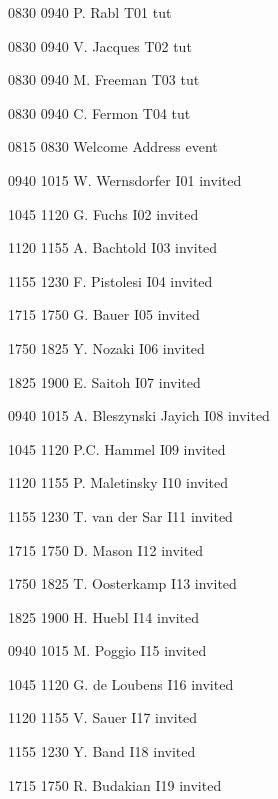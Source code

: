 
         {0830} {0940} {P. Rabl    } {} {T01} {tut}
        
         {0830} {0940} {V. Jacques} {} {T02} {tut}
        
         {0830} {0940} {M. Freeman} {} {T03} {tut}
        
         {0830} {0940} {C. Fermon} {} {T04} {tut}
        
         {0815} {0830} {\ft Welcome Address} {} {} {event}
        
         {0940} {1015} {W. Wernsdorfer} {} {I01} {invited}
        
         {1045} {1120} {G. Fuchs} {} {I02} {invited}
        
         {1120} {1155} {A. Bachtold} {} {I03} {invited}
        
         {1155} {1230} {F. Pistolesi} {} {I04} {invited}
        
         {1715} {1750} {G. Bauer} {} {I05} {invited}
        
         {1750} {1825} {Y. Nozaki} {} {I06} {invited}
        
         {1825} {1900} {E. Saitoh} {} {I07} {invited}
        
         {0940} {1015} {A. Bleszynski Jayich} {} {I08} {invited}
        
         {1045} {1120} {P.C. Hammel} {} {I09} {invited}
        
         {1120} {1155} {P. Maletinsky} {} {I10} {invited}
        
         {1155} {1230} {T. van der Sar} {} {I11} {invited}
        
         {1715} {1750} {D. Mason} {} {I12} {invited}
        
         {1750} {1825} {T. Oosterkamp} {} {I13} {invited}
        
         {1825} {1900} {H. Huebl} {} {I14} {invited}
        
         {0940} {1015} {M. Poggio} {} {I15} {invited}
        
         {1045} {1120} {G. de Loubens} {} {I16} {invited}
        
         {1120} {1155} {V. Sauer} {} {I17} {invited}
        
         {1155} {1230} {Y. Band} {} {I18} {invited}
        
         {1715} {1750} {R. Budakian} {} {I19} {invited}
        

